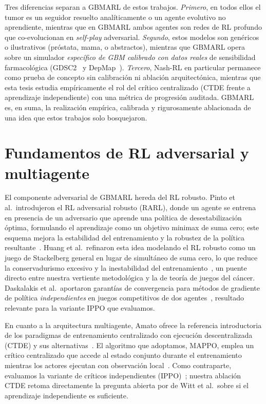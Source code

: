 Tres diferencias separan a GBMARL de estos trabajos. \emph{Primero}, en todos ellos el tumor es un seguidor resuelto analíticamente o un agente evolutivo no aprendiente, mientras que en GBMARL ambos agentes son redes de RL profundo que co-evolucionan en \emph{self-play} adversarial. \emph{Segundo}, estos modelos son genéricos o ilustrativos (próstata, mama, o abstractos), mientras que GBMARL opera sobre un simulador \emph{específico de GBM calibrado con datos reales} de sensibilidad farmacológica (GDSC2~\cite{GDSC} y DepMap~\cite{DepMap}). \emph{Tercero}, Nash-RL en particular permanece como prueba de concepto sin calibración ni ablación arquitectónica, mientras que esta tesis estudia empíricamente el rol del crítico centralizado (CTDE frente a aprendizaje independiente) con una métrica de progresión auditada. GBMARL es, en suma, la realización empírica, calibrada y rigurosamente ablacionada de una idea que estos trabajos solo bosquejaron.

\section{Fundamentos de RL adversarial y multiagente}
\label{sec:fundamentos-marl}

El componente adversarial de GBMARL hereda del RL robusto. Pinto et al.\ introdujeron el RL adversarial robusto (RARL), donde un agente se entrena en presencia de un adversario que aprende una política de desestabilización óptima, formulando el aprendizaje como un objetivo minimax de suma cero; este esquema mejora la estabilidad del entrenamiento y la robustez de la política resultante~\cite{Pinto2017}. Huang et al.\ refinaron esta idea modelando el RL robusto como un juego de Stackelberg general en lugar de simultáneo de suma cero, lo que reduce la conservadurismo excesivo y la inestabilidad del entrenamiento~\cite{Huang2022}, un puente directo entre nuestra vertiente metodológica y la de teoría de juegos del cáncer. Daskalakis et al.\ aportaron garantías de convergencia para métodos de gradiente de política \emph{independientes} en juegos competitivos de dos agentes~\cite{Daskalakis2021}, resultado relevante para la variante IPPO que evaluamos.

En cuanto a la arquitectura multiagente, Amato ofrece la referencia introductoria de los paradigmas de entrenamiento centralizado con ejecución descentralizada (CTDE) y sus alternativas~\cite{Amato2024}. El algoritmo que adoptamos, MAPPO, emplea un crítico centralizado que accede al estado conjunto durante el entrenamiento mientras los actores ejecutan con observación local~\cite{Wang2025MAPPO}. Como contraparte, evaluamos la variante de críticos independientes (IPPO)~\cite{deWitt2020}; nuestra ablación CTDE retoma directamente la pregunta abierta por de Witt et al.\ sobre si el aprendizaje independiente es suficiente.

